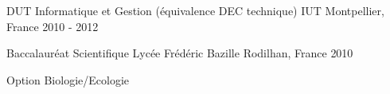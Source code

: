 \begin{cventries}
\cventry
  {DUT Informatique et Gestion (équivalence DEC technique)} %
  {IUT} %
  {Montpellier, France} %
  {2010 - 2012} %
  {}

\cventry
  {Baccalauréat Scientifique} %
  {Lycée Frédéric Bazille} %
  {Rodilhan, France} %
  {2010} %
  {
    \begin{cvitems} %
      \item {Option Biologie/Ecologie}
    \end{cvitems}
  }

\end{cventries}
